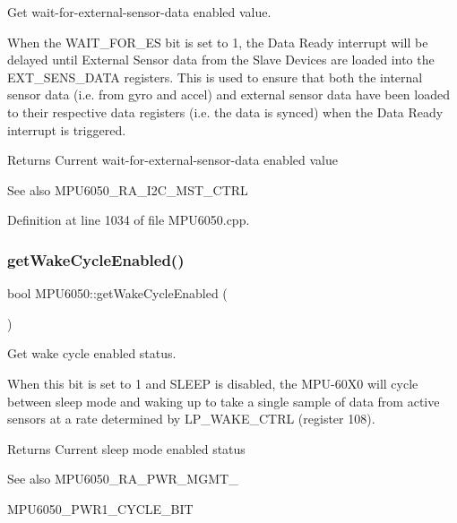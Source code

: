Get wait-\/for-\/external-\/sensor-\/data enabled value. 

When the W\+A\+I\+T\+\_\+\+F\+O\+R\+\_\+\+ES bit is set to 1, the Data Ready interrupt will be delayed until External Sensor data from the Slave Devices are loaded into the E\+X\+T\+\_\+\+S\+E\+N\+S\+\_\+\+D\+A\+TA registers. This is used to ensure that both the internal sensor data (i.\+e. from gyro and accel) and external sensor data have been loaded to their respective data registers (i.\+e. the data is synced) when the Data Ready interrupt is triggered.

\begin{DoxyReturn}{Returns}
Current wait-\/for-\/external-\/sensor-\/data enabled value 
\end{DoxyReturn}
\begin{DoxySeeAlso}{See also}
M\+P\+U6050\+\_\+\+R\+A\+\_\+\+I2\+C\+\_\+\+M\+S\+T\+\_\+\+C\+T\+RL 
\end{DoxySeeAlso}


Definition at line 1034 of file M\+P\+U6050.\+cpp.

\mbox{\label{classMPU6050_a89afc5235b9088c696e2cc7841f5259a}} 
\subsubsection{\texorpdfstring{getWakeCycleEnabled()}{getWakeCycleEnabled()}}
{\footnotesize\ttfamily bool M\+P\+U6050\+::get\+Wake\+Cycle\+Enabled (\begin{DoxyParamCaption}{ }\end{DoxyParamCaption})}



Get wake cycle enabled status. 

When this bit is set to 1 and S\+L\+E\+EP is disabled, the M\+P\+U-\/60\+X0 will cycle between sleep mode and waking up to take a single sample of data from active sensors at a rate determined by L\+P\+\_\+\+W\+A\+K\+E\+\_\+\+C\+T\+RL (register 108). \begin{DoxyReturn}{Returns}
Current sleep mode enabled status 
\end{DoxyReturn}
\begin{DoxySeeAlso}{See also}
M\+P\+U6050\+\_\+\+R\+A\+\_\+\+P\+W\+R\+\_\+\+M\+G\+M\+T\+\_ 

M\+P\+U6050\+\_\+\+P\+W\+R1\+\_\+\+C\+Y\+C\+L\+E\+\_\+\+B\+IT 
\end{DoxySeeAlso}


